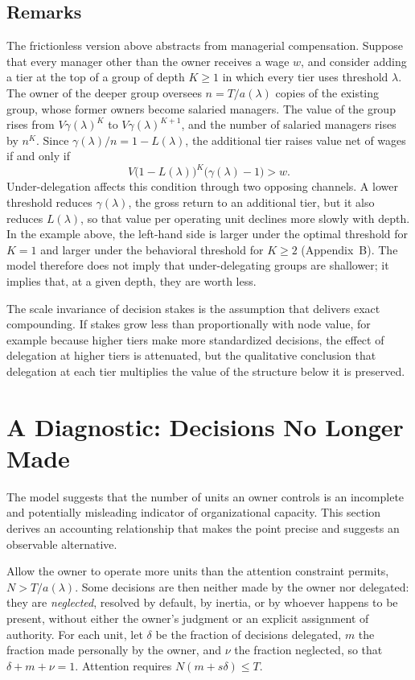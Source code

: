 \documentclass[11pt,a4paper]{article}
\theoremstyle{plain}
\begin{document}
\subsection{Remarks}

The frictionless version above abstracts from managerial compensation. Suppose that every manager other than the owner receives a wage $w$, and consider adding a tier at the top of a group of depth $K \ge 1$ in which every tier uses threshold $\lambda$. The owner of the deeper group oversees $n = T/a(\lambda)$ copies of the existing group, whose former owners become salaried managers. The value of the group rises from $V\gamma(\lambda)^K$ to $V\gamma(\lambda)^{K+1}$, and the number of salaried managers rises by $n^K$. Since $\gamma(\lambda)/n = 1 - L(\lambda)$, the additional tier raises value net of wages if and only if
\[
  V \big(1 - L(\lambda)\big)^K \big(\gamma(\lambda) - 1\big) > w.
\]
Under-delegation affects this condition through two opposing channels. A lower threshold reduces $\gamma(\lambda)$, the gross return to an additional tier, but it also reduces $L(\lambda)$, so that value per operating unit declines more slowly with depth. In the example above, the left-hand side is larger under the optimal threshold for $K = 1$ and larger under the behavioral threshold for $K \ge 2$ (Appendix~B). The model therefore does not imply that under-delegating groups are shallower; it implies that, at a given depth, they are worth less.

The scale invariance of decision stakes is the assumption that delivers exact compounding. If stakes grow less than proportionally with node value, for example because higher tiers make more standardized decisions, the effect of delegation at higher tiers is attenuated, but the qualitative conclusion that delegation at each tier multiplies the value of the structure below it is preserved.

\section{A Diagnostic: Decisions No Longer Made}\label{sec:diagnostic}

The model suggests that the number of units an owner controls is an incomplete and potentially misleading indicator of organizational capacity. This section derives an accounting relationship that makes the point precise and suggests an observable alternative.

Allow the owner to operate more units than the attention constraint permits, $N > T / a(\lambda)$. Some decisions are then neither made by the owner nor delegated: they are \emph{neglected}, resolved by default, by inertia, or by whoever happens to be present, without either the owner's judgment or an explicit assignment of authority. For each unit, let $\delta$ be the fraction of decisions delegated, $m$ the fraction made personally by the owner, and $\nu$ the fraction neglected, so that $\delta + m + \nu = 1$. Attention requires $N(m + s\delta) \le T$.
\end{document}
